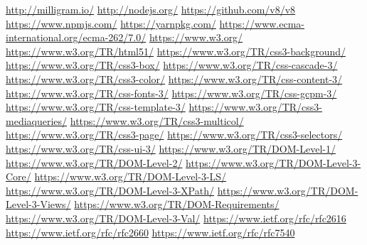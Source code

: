 \documentclass[polish, twoside, 12pt]{mwart}
\begin{document}
\begin{thebibliography}{11}
    \url{http://milligram.io/}
    \url{http://nodejs.org/}
    \url{https://github.com/v8/v8}
    \url{https://www.npmjs.com/}
    \url{https://yarnpkg.com/}
    \url{https://www.ecma-international.org/ecma-262/7.0/}
    \url{https://www.w3.org/}
    \url{https://www.w3.org/TR/html51/}
    \url{https://www.w3.org/TR/css3-background/}
    \url{https://www.w3.org/TR/css3-box/}
    \url{https://www.w3.org/TR/css-cascade-3/}
    \url{https://www.w3.org/TR/css3-color/}
    \url{https://www.w3.org/TR/css-content-3/}
    \url{https://www.w3.org/TR/css-fonts-3/}
    \url{https://www.w3.org/TR/css-gcpm-3/}
    \url{https://www.w3.org/TR/css-template-3/}
    \url{https://www.w3.org/TR/css3-mediaqueries/}
    \url{https://www.w3.org/TR/css3-multicol/}
    \url{https://www.w3.org/TR/css3-page/}
    \url{https://www.w3.org/TR/css3-selectors/}
    \url{https://www.w3.org/TR/css-ui-3/}
    \url{https://www.w3.org/TR/DOM-Level-1/}
    \url{https://www.w3.org/TR/DOM-Level-2/}
    \url{https://www.w3.org/TR/DOM-Level-3-Core/}
    \url{https://www.w3.org/TR/DOM-Level-3-LS/}
    \url{https://www.w3.org/TR/DOM-Level-3-XPath/}
    \url{https://www.w3.org/TR/DOM-Level-3-Views/}
    \url{https://www.w3.org/TR/DOM-Requirements/}
    \url{https://www.w3.org/TR/DOM-Level-3-Val/}
    \url{https://www.ietf.org/rfc/rfc2616}
    \url{https://www.ietf.org/rfc/rfc2660}
    \url{https://www.ietf.org/rfc/rfc7540}
\end{thebibliography}
\end{document}
